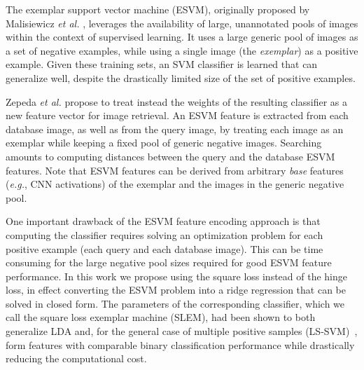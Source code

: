 The exemplar support vector machine (ESVM), originally proposed by Malisiewicz {\it et al.} \cite{Malisiewicza}, leverages the availability of large, unannotated pools of images within the context of supervised learning. It uses a large generic pool of images as a set of negative examples, while using a single image (the \emph{exemplar}) as a positive example. Given these training sets, an SVM classifier is learned that can  generalize well, despite the drastically limited size of the set of positive examples.

Zepeda \emph{et al.} \cite{ZePe15} propose to treat instead the weights of the resulting classifier as a new feature vector for image retrieval. %
An ESVM feature is extracted from each database image, as well as from the query image, by treating each image as an exemplar while keeping a fixed pool of generic negative images. Searching amounts to computing distances between the query and the database ESVM features. Note that ESVM features can be derived from arbitrary \emph{base} features ({\it e.g.}, CNN activations) of the exemplar and the images in the generic negative pool. %


One important drawback of the ESVM feature encoding approach is that computing the  classifier requires solving an optimization problem for each positive example (\ie each query and each database image). This can be time consuming for the large negative pool sizes required for good ESVM feature performance. In this work we propose using the square loss instead of the hinge loss, in effect converting the ESVM problem into a ridge regression that can be solved in closed form. The parameters of the corresponding classifier, which we call the square loss exemplar machine (SLEM), had been shown to both generalize LDA \cite{Koba15} and, for the general case of multiple positive samples (LS-SVM)~\cite{lssvm}, form features with comparable binary classification performance while drastically reducing the computational cost.


